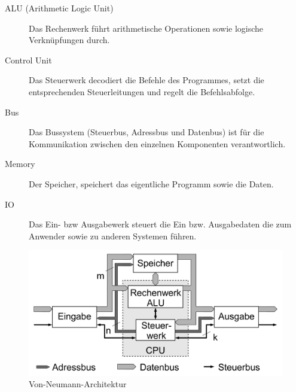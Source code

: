                     \begin{description}
                        \item[ALU (Arithmetic Logic Unit)] Das Rechenwerk führt arithmetische Operationen sowie logische Verknüpfungen durch. 
                        \item[Control Unit] Das Steuerwerk decodiert die Befehle des Programmes,
                        setzt die entsprechenden Steuerleitungen und regelt die Befehlsabfolge.
                        \item[Bus] Das Bussystem (Steuerbus, Adressbus und Datenbus) ist für die Kommunikation zwischen den einzelnen
                        Komponenten verantwortlich.
                        \item[Memory] Der Speicher, speichert das eigentliche Programm sowie die Daten.
                        \item[IO] Das Ein- bzw Ausgabewerk steuert die Ein bzw. Ausgabedaten die zum Anwender sowie zu anderen Systemen führen.
                    \end{description}
                    \begin{figure}[H]
                        \centering
                        \includegraphics[scale=0.2]{img/vonneumann.png}
                        \caption[Von-Neumann-Architektur]{Von-Neumann-Architektur \cite{von-neumann-architektur}}
                        \label{fig:vonneumann}
                    \end{figure}

